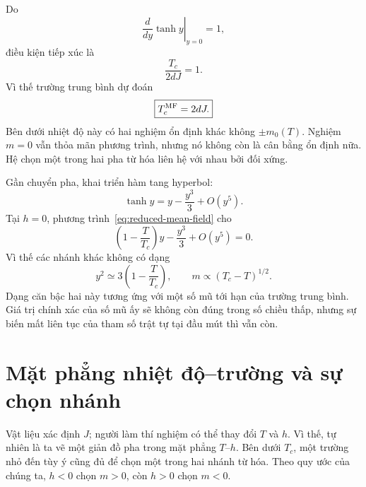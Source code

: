 Do
\begin{equation}
\left.\frac{d}{dy}\tanh y\right|_{y=0}=1,
\end{equation}
điều kiện tiếp xúc là
\begin{equation}
\frac{T_c}{2dJ}=1.
\end{equation}
Vì thế trường trung bình dự đoán
\begin{equation}
\boxed{T_c^{\rm MF}=2dJ.}
\label{eq:sm10-mean-field-tc}
\end{equation}
Bên dưới nhiệt độ này có hai nghiệm ổn định khác không \(\pm m_0(T)\). Nghiệm \(m=0\) vẫn thỏa mãn phương trình, nhưng nó không còn là cân bằng ổn định nữa. Hệ chọn một trong hai pha từ hóa liên hệ với nhau bởi đối xứng.

\begin{classroomqa}
\end{classroomqa}

Gần chuyển pha, khai triển hàm tang hyperbol:
\begin{equation}
\tanh y=y-\frac{y^3}{3}+O(y^5).
\end{equation}
Tại \(h=0\), phương trình~\eqref{eq:reduced-mean-field} cho
\begin{equation}
\left(1-\frac{T}{T_c}\right)y-\frac{y^3}{3}+O(y^5)=0.
\end{equation}
Vì thế các nhánh khác không có dạng
\begin{equation}
y^2\simeq3\left(1-\frac{T}{T_c}\right),
\qquad
m\propto(T_c-T)^{1/2}.
\label{eq:mf-beta-exponent}
\end{equation}
Dạng căn bậc hai này tương ứng với một số mũ tới hạn của trường trung bình. Giá trị chính xác của số mũ ấy sẽ không còn đúng trong số chiều thấp, nhưng sự biến mất liên tục của tham số trật tự tại đầu mút thì vẫn còn.

\section{Mặt phẳng nhiệt độ--trường và sự chọn nhánh}

Vật liệu xác định \(J\); người làm thí nghiệm có thể thay đổi \(T\) và \(h\). Vì thế, tự nhiên là ta vẽ một giản đồ pha trong mặt phẳng \(T\)--\(h\). Bên dưới \(T_c\), một trường nhỏ đến tùy ý cũng đủ để chọn một trong hai nhánh từ hóa. Theo quy ước của chúng ta, \(h<0\) chọn \(m>0\), còn \(h>0\) chọn \(m<0\).

